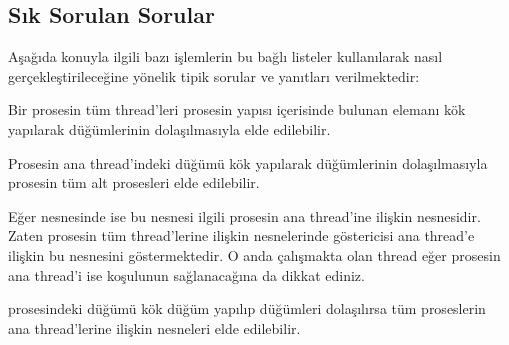 \documentclass[a4paper,10pt,turkish]{sphinxmanual}
\begin{document}
\subsection{Sık Sorulan Sorular}
\label{\detokenize{processcontrolblock:sik-sorulan-sorular}}
\sphinxAtStartPar
Aşağıda konuyla ilgili bazı işlemlerin bu bağlı listeler kullanılarak nasıl gerçekleştirileceğine yönelik
tipik sorular ve yanıtları verilmektedir:

\sphinxAtStartPar
{}

\sphinxAtStartPar
Bir prosesin tüm thread’leri prosesin  yapısı içerisinde bulunan  elemanı kök
yapılarak  düğümlerinin dolaşılmasıyla elde edilebilir.

\sphinxAtStartPar
{}

\sphinxAtStartPar
Prosesin ana thread’indeki  düğümü kök yapılarak  düğümlerinin dolaşılmasıyla
prosesin tüm alt prosesleri elde edilebilir.

\sphinxAtStartPar
{}

\sphinxAtStartPar
Eğer  nesnesinde  ise bu  nesnesi ilgili prosesin ana
thread’ine ilişkin  nesnesidir. Zaten prosesin tüm thread’lerine ilişkin 
nesnelerinde  göstericisi ana thread’e ilişkin bu  nesnesini
göstermektedir. O anda çalışmakta olan thread eğer prosesin ana thread’i ise 
koşulunun sağlanacağına da dikkat ediniz.

\sphinxAtStartPar
{}

\sphinxAtStartPar
{} prosesindeki  düğümü kök düğüm yapılıp  düğümleri dolaşılırsa tüm
proseslerin ana thread’lerine ilişkin  nesneleri elde edilebilir.
\end{document}
